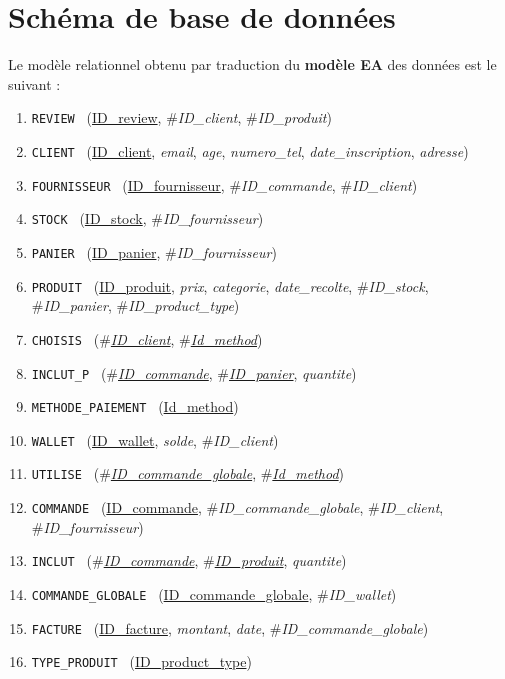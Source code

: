 \documentclass[a4paper,12pt]{report}
\newcommand{\attr}[1]{\emph{#1}}
\newcommand{\texit}[1]{\#\textsl{#1}}
\theoremstyle{break}
\theoremstyle{break}
\theoremstyle{break}
\theoremstyle{break}
\theoremstyle{definition}
\theoremstyle{remark}
\begin{document}
\section{Schéma de base de données}
Le modèle relationnel obtenu par traduction du \textbf{modèle EA} des données est le suivant :
\begin{enumerate}
  \item { \texttt{REVIEW } (\underline{ID\_review}, \texit{ID\_client}, \texit{ID\_produit}) }
  \item { \texttt{CLIENT } (\underline{ID\_client}, \attr{email}, \attr{age}, \attr{numero\_tel}, \attr{date\_inscription}, \attr{adresse}) }
  \item { \texttt{FOURNISSEUR } (\underline{ID\_fournisseur}, \texit{ID\_commande}, \texit{ID\_client}) }
  \item { \texttt{STOCK } (\underline{ID\_stock}, \texit{ID\_fournisseur}) }
  \item { \texttt{PANIER } (\underline{ID\_panier}, \texit{ID\_fournisseur}) }
  \item { \texttt{PRODUIT } (\underline{ID\_produit}, \attr{prix}, \attr{categorie}, \attr{date\_recolte}, \texit{ID\_stock}, \texit{ID\_panier}, \texit{ID\_product\_type}) }
  \item { \texttt{CHOISIS } (\texit{\underline{ID\_client}}, \texit{\underline{Id\_method}}) }
  \item { \texttt{INCLUT\_P } (\texit{\underline{ID\_commande}}, \texit{\underline{ID\_panier}}, \attr{quantite}) }
  \item { \texttt{METHODE\_PAIEMENT } (\underline{Id\_method}) }
  \item { \texttt{WALLET } (\underline{ID\_wallet}, \attr{solde}, \texit{ID\_client}) }
  \item { \texttt{UTILISE } (\texit{\underline{ID\_commande\_globale}}, \texit{\underline{Id\_method}}) }
  \item { \texttt{COMMANDE } (\underline{ID\_commande}, \texit{ID\_commande\_globale}, \texit{ID\_client}, \texit{ID\_fournisseur}) }
  \item { \texttt{INCLUT } (\texit{\underline{ID\_commande}}, \texit{\underline{ID\_produit}}, \attr{quantite}) }
  \item { \texttt{COMMANDE\_GLOBALE } (\underline{ID\_commande\_globale}, \texit{ID\_wallet}) }
  \item { \texttt{FACTURE } (\underline{ID\_facture}, \attr{montant}, \attr{date}, \texit{ID\_commande\_globale}) }
  \item { \texttt{TYPE\_PRODUIT } (\underline{ID\_product\_type})}
\end{enumerate}
\end{document}
